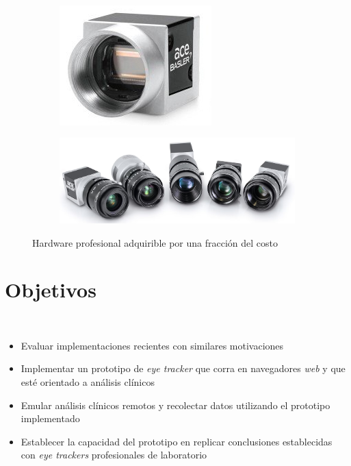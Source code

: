 \documentclass[aspectratio=169]{beamer}
\begin{document}
\begin{frame}{~}
  \begin{figure}
    \begin{subfigure}{0.49\textwidth}
      \centering
      \includegraphics[width=0.35\linewidth]{img/basler-camera.jpg}
    \end{subfigure}
    \begin{subfigure}{0.49\textwidth}
      \centering
      \includegraphics[width=0.6\linewidth]{img/basler-cameras-with-lens.png}
    \end{subfigure}
    \caption{Hardware profesional adquirible por una fracción del costo}
  \end{figure}

\end{frame}

\section{Objetivos}

\begin{frame}{~}

  \begin{itemize}
    \item Evaluar implementaciones recientes con similares motivaciones

    \item Implementar un prototipo de \textit{eye tracker} que corra en
      navegadores \textit{web} y que esté orientado a análisis clínicos

    \item Emular análisis clínicos remotos y recolectar datos utilizando el 
      prototipo implementado

    \item Establecer la capacidad del prototipo en replicar conclusiones
      establecidas con \textit{eye trackers} profesionales de laboratorio

  \end{itemize}

\end{frame}
\end{document}
